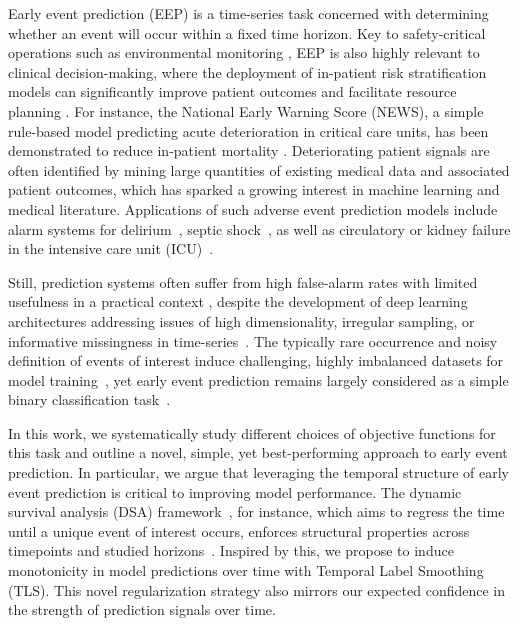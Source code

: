 \documentclass[nohyperref]{article}
\begin{document}
Early event prediction (EEP) is a time-series task concerned with determining whether an event will occur within a fixed time horizon. Key to safety-critical operations such as environmental monitoring \citep{DiGiuseppe2016}, EEP is also highly relevant to clinical decision-making, where the deployment of in-patient risk stratification models can significantly improve patient outcomes and facilitate resource planning \citep{sutton2020}. For instance, the National Early Warning Score (NEWS), a simple rule-based model predicting acute deterioration in critical care units, has been demonstrated to reduce in-patient mortality \citep{smith2013, pullyblank2020implementation}. Deteriorating patient signals are often identified by mining large quantities of existing medical data and associated patient outcomes, which has sparked a growing interest in machine learning and medical literature. Applications of such adverse event prediction models include alarm systems for delirium~\citep{wong2018development}, septic shock~\citep{fagerstrom2019lisep}, as well as circulatory or kidney failure in the intensive care unit (ICU)~\citep{hyland2020, tomavsev2019}.

Still, prediction systems often suffer from high false-alarm rates with limited usefulness in a practical context \citep{sutton2020}, despite the development of deep learning architectures addressing issues of high dimensionality, irregular sampling, or informative missingness in time-series~\citep{fagerstrom2019lisep,tomavsev2019,DBLP:conf/icml/HornMBRB20,DBLP:conf/iclr/ShuklaM21}. The typically rare occurrence and noisy definition of events of interest induce challenging, highly imbalanced datasets for model training~\citep{tomavsev2019}, yet early event prediction remains largely considered as a simple binary classification task~\citep{hyland2020, Lauritsen2020, DBLP:conf/icml/HornMBRB20, roy2021multitask}. 

In this work, we systematically study different choices of objective functions for this task and outline a novel, simple, yet best-performing approach to early event prediction. In particular, we argue that leveraging the temporal structure of early event prediction is critical to improving model performance. The dynamic survival analysis (DSA) framework~\citep{van2007dynamic}, for instance, which aims to regress the time until a unique event of interest occurs, enforces structural properties across timepoints and studied horizons~\cite{lee2019dynamic,jarrett2019dynamic}. Inspired by this, we propose to induce monotonicity in model predictions over time with Temporal Label Smoothing (TLS). This novel regularization strategy also mirrors our expected confidence in the strength of prediction signals over time.
\end{document}
